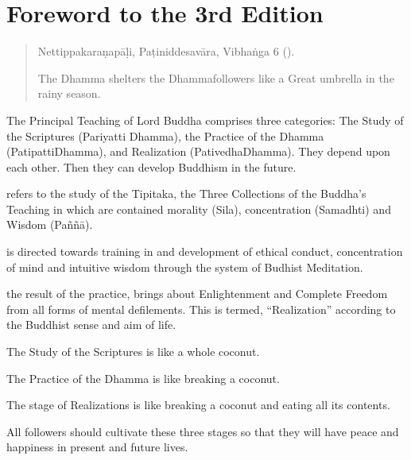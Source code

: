 \documentclass[a5paper,10pt,english]{book}
\begin{document}
\clearpage


\section{Foreword to the 3rd Edition}
\label{\detokenize{front:foreword-to-the-3rd-edition}}\begin{quote}

\sphinxAtStartPar
{} %
\begin{footnote}[1]\sphinxAtStartFootnote
Nettippakaraṇapāḷi, Paṭi­niddesa­vāra, Vibhaṅga 6 ().
%
\end{footnote}

\sphinxAtStartPar
The Dhamma shelters the Dhamma\sphinxhyphen{}followers like a Great umbrella in the rainy season.
\end{quote}

\sphinxAtStartPar
The Principal Teaching of Lord Buddha comprises three categories: The Study of the Scriptures (Pariyatti Dhamma), the Practice of the Dhamma (Patipatti\sphinxhyphen{}Dhamma), and Realization (Pativedha\sphinxhyphen{}Dhamma). They depend upon each other. Then they can develop Buddhism in the future.

\sphinxAtStartPar
{} refers to the study of the Tipitaka, the Three Collections of the Buddha’s Teaching in which are contained morality (Sila), concentration (Samadhti) and Wisdom (Paññā).

\sphinxAtStartPar
{} is directed towards training in and development of ethical conduct, concentration of mind and intuitive wisdom through the system of Budhist Meditation.

\sphinxAtStartPar
{} the result of the practice, brings about Enlightenment and Complete Freedom from all forms of mental defilements. This is termed, “Realization” according to the Buddhist sense and aim of life.

\sphinxAtStartPar
The Study of the Scriptures is like a whole coconut.

\sphinxAtStartPar
The Practice of the Dhamma is like breaking a coconut.

\sphinxAtStartPar
The stage of Realizations is like breaking a coconut and eating all its contents.

\sphinxAtStartPar
All followers should cultivate these three stages so that they will have peace and happiness in present and future lives.
\end{document}
